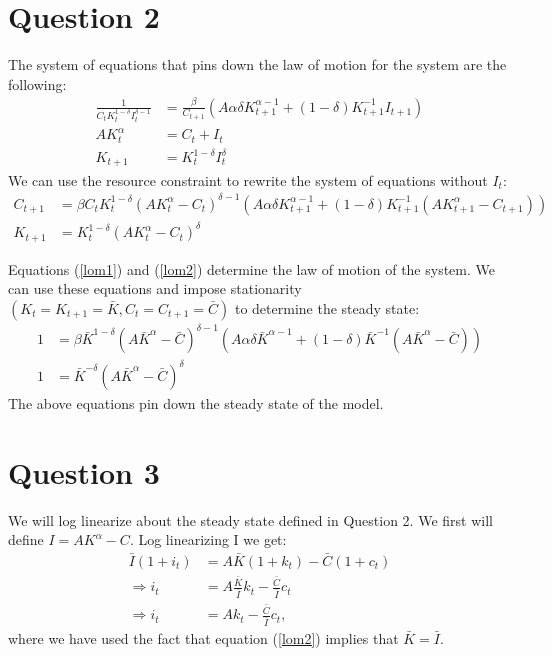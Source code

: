 \documentclass[11pt]{article} %
\begin{document}
\section{Question 2}
The system of equations that pins down the law of motion for the system are the following:
\begin{align*}
\frac{1}{C_tK_t^{1-\delta}I_t^{\delta - 1}}  &= \frac{\beta}{C_{t+1}}(A\alpha \delta K_{t+1}^{\alpha - 1} + (1-\delta)K_{t+1}^{-1}I_{t+1})\\
AK_t^{\alpha} &= C_t + I_t \\
K_{t+1} &= K_t^{1-\delta}I_t^{\delta}
\end{align*}
We can use the resource constraint to rewrite the system of equations without $I_t$:
\begin{align}
C_{t+1} &= \beta C_tK_t^{1-\delta}(AK_t^{\alpha} - C_t)^{\delta - 1}(A\alpha \delta K_{t+1}^{\alpha - 1}  + (1-\delta)K_{t+1}^{-1}(AK_{t+1}^{\alpha} - C_{t+1}) ) \label{lom1}\\
K_{t+1} &= K_t^{1-\delta}(AK_t^{\alpha} - C_t)^{\delta} \label{lom2}
\end{align}

Equations (\ref{lom1}) and (\ref{lom2}) determine the law of motion of the system. We can use these equations and impose stationarity $(K_t = K_{t+1} = \bar{K}, C_t = C_{t+1} = \bar{C})$ to determine the steady state:
\begin{align*}
1 &= \beta \bar{K}^{1-\delta}(A\bar{K}^{\alpha} - \bar{C})^{\delta - 1}(A\alpha \delta \bar{K}^{\alpha - 1} + (1 - \delta) \bar{K}^{-1}(A\bar{K}^{\alpha} - \bar{C})) \\
1 &= \bar{K}^{-\delta}(A\bar{K}^{\alpha} - \bar{C})^\delta
\end{align*}
The above equations pin down the steady state of the model.
\section{Question 3}
We will log linearize about the steady state defined in Question 2. We first will define $I = AK^{\alpha} - C.$ Log linearizing I we get:
\begin{align*}
\bar{I}(1+i_t) &= A\bar{K}(1+k_t) - \bar{C}(1+c_t)\\
\Rightarrow i_t &= A\frac{\bar{K}}{\bar{I}}k_t - \frac{\bar{C}}{\bar{I}}c_t \\
\Rightarrow i_t &= Ak_t - \frac{\bar{C}}{\bar{I}}c_t ,
\end{align*}
where we have used the fact that equation (\ref{lom2}) implies that $\bar{K} = \bar{I}$.
\end{document}
